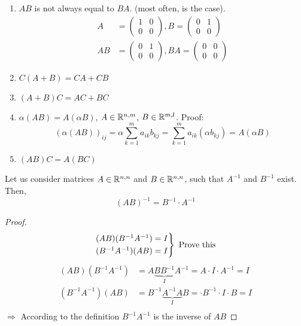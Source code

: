 \begin{properties}
\begin{enumerate}
\item $AB$ is  not always equal to $BA$. (most often, is the case). 
\begin{align*}
A &= \begin{pmatrix}
1 & 0\\
0 & 0
\end{pmatrix}, B = \begin{pmatrix}
0 & 1 \\
0 & 0
\end{pmatrix}\\
AB &= \begin{pmatrix}
0 & 1 \\
0 & 0
\end{pmatrix}, BA = \begin{pmatrix}
0 & 0 \\
0 & 0
\end{pmatrix}
\end{align*}
\item $C(A+B) = CA + CB$
\item $(A+B)C = AC+BC$
\item $\alpha (AB) = A(\alpha B)$, $A\in\mathbb{R}^{n,m}$, $B\in\mathbb{R}^{m,l}$. Proof:
\[
\left( \alpha(AB)\right)_{ij} = \alpha\sum\limits^{m}_{k=1} a_{ik}b_{kj} = \sum\limits^{m}_{k=1} a_{ik}(\alpha b_{kj}) = A(\alpha B)
\]
\item $(AB)C = A(BC)$
\end{enumerate}
\end{properties}

\begin{theorem}
Let us consider matrices $A\in\mathbb{R}^{n,n}$ and $B\in\mathbb{R}^{n,n}$, such that $A^{-1}$ and $B^{-1}$ exist. Then,
\[
(AB)^{-1} = B^{-1}\cdot A^{-1}
\]
\end{theorem}
\begin{proof}
\[
\begin{rcases*}
(AB)(B^{-1} A^{-1}) = I\\
(B^{-1} A^{-1})(AB) = I
\end{rcases*}\text{ Prove this}
\]
\begin{align*}
(AB)(B^{-1} A^{-1}) &= A\underbrace{BB^{-1}}_{I} A^{-1} = A\cdot I \cdot A^{-1} = I\\
(B^{-1} A^{-1})(AB) &= B^{-1}\underbrace{A^{-1}A}_{I} B =  \cdot B^{-1} \cdot I \cdot B= I\\
\end{align*}
$\Rightarrow$ According to the definition $B^{-1} A^{-1}$ is the inverse of $AB$
\end{proof}

